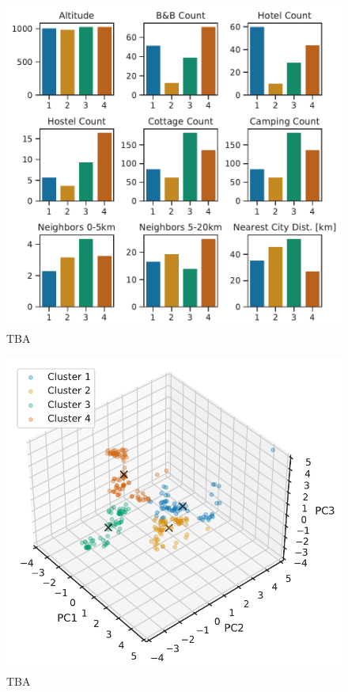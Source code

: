 \documentclass[11pt,a4paper]{article}
\begin{document}
\begin{figure} [h!]
  \centering
  \includegraphics{report/cluster_features_1.pdf}
  \caption{TBA}
  \label{fds-project-template:fig:scatterplot}
\end{figure}

\begin{figure} [h!]
  \centering
  \includegraphics{report/3d_clusters.pdf}
  \caption{TBA}
  \label{fds-project-template:fig:scatterplot}
\end{figure}
\end{document}
